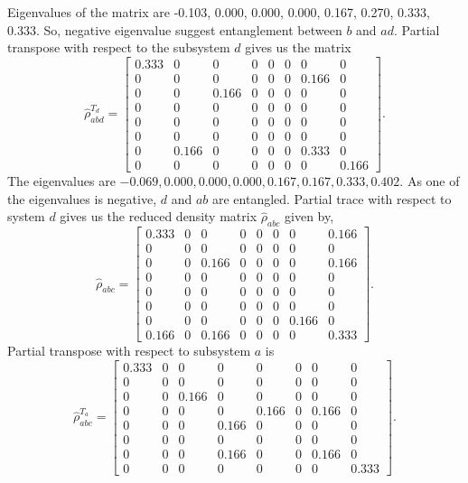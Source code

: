 \documentclass{scrartcl}
\begin{document}
Eigenvalues of the matrix are -0.103, 0.000, 0.000, 0.000, 0.167, 0.270, 0.333, 0.333. So, negative eigenvalue suggest entanglement between $b$ and $ad$.
Partial transpose with respect to the subsystem $d$ gives us the matrix
\begin{equation*}
	\hat{\rho}_{abd}^{T_d} = \left[\begin{matrix}0.333 & 0 & 0 & 0 & 0 & 0 & 0 & 0\\0 & 0 & 0 & 0 & 0 & 0 & 0.166 & 0\\0 & 0 & 0.166 & 0 & 0 & 0 & 0 & 0\\0 & 0 & 0 & 0 & 0 & 0 & 0 & 0\\0 & 0 & 0 & 0 & 0 & 0 & 0 & 0\\0 & 0 & 0 & 0 & 0 & 0 & 0 & 0\\0 & 0.166 & 0 & 0 & 0 & 0 & 0.333 & 0\\0 & 0 & 0 & 0 & 0 & 0 & 0 & 0.166\end{matrix}\right].
\end{equation*}
The eigenvalues are $-0.069, 0.000, 0.000, 0.000, 0.167, 0.167, 0.333, 0.402$. As one of the eigenvalues is negative, $d$ and $ab$ are entangled.
Partial trace with respect to system $d$ gives us the reduced density matrix $\hat{\rho}_{abc}$ given by,
\begin{equation*}
	\hat{\rho}_{abc} =\left[\begin{matrix}0.333 & 0 & 0 & 0 & 0 & 0 & 0 & 0.166\\0 & 0 & 0 & 0 & 0 & 0 & 0 & 0\\0 & 0 & 0.166 & 0 & 0 & 0 & 0 & 0.166\\0 & 0 & 0 & 0 & 0 & 0 & 0 & 0\\0 & 0 & 0 & 0 & 0 & 0 & 0 & 0\\0 & 0 & 0 & 0 & 0 & 0 & 0 & 0\\0 & 0 & 0 & 0 & 0 & 0 & 0.166 & 0\\0.166 & 0 & 0.166 & 0 & 0 & 0 & 0 & 0.333\end{matrix}\right]
	.
\end{equation*}
Partial transpose with respect to subsystem $a$ is
\begin{equation*}
	\hat{\rho}_{abc}^{T_a} = \left[\begin{matrix}0.333 & 0 & 0 & 0 & 0 & 0 & 0 & 0\\0 & 0 & 0 & 0 & 0 & 0 & 0 & 0\\0 & 0 & 0.166 & 0 & 0 & 0 & 0 & 0\\0 & 0 & 0 & 0 & 0.166 & 0 & 0.166 & 0\\0 & 0 & 0 & 0.166 & 0 & 0 & 0 & 0\\0 & 0 & 0 & 0 & 0 & 0 & 0 & 0\\0 & 0 & 0 & 0.166 & 0 & 0 & 0.166 & 0\\0 & 0 & 0 & 0 & 0 & 0 & 0 & 0.333\end{matrix}\right]
	.
\end{equation*}
\end{document}
